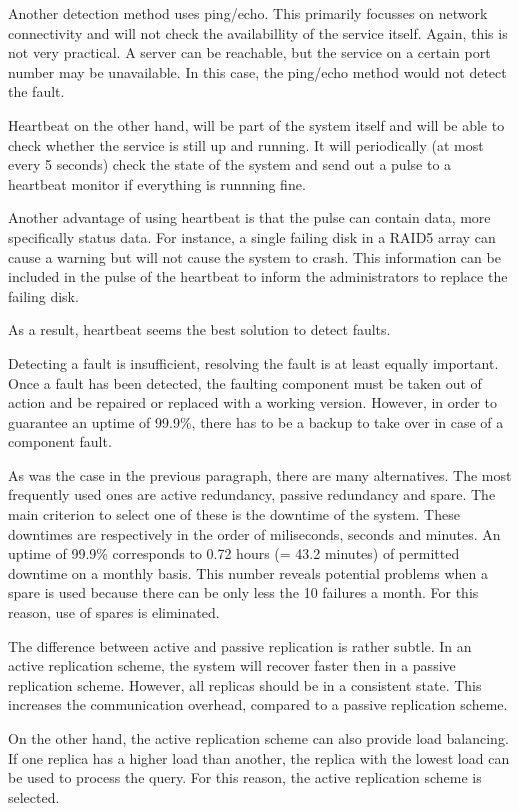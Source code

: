 \npar Another detection method uses ping/echo. This primarily focusses on
network connectivity and will not check the availabillity of the service itself.
Again, this is not very practical. A server can be reachable, but the service on
a certain port number may be unavailable. In this case, the ping/echo
method would not detect the fault. 

\npar Heartbeat on the other hand, will be part of the system itself and will be
able to check whether the service is still up and running. It will periodically
(at most every 5 seconds) check the state of the system and send out a pulse
to a heartbeat monitor if everything is runnning fine.

\npar Another advantage of using heartbeat is that the pulse can contain data,
more specifically status data. For instance, a single failing disk in a RAID5
array can cause a warning but will not cause the system to crash. This
information can be included in the pulse of the heartbeat to inform the
administrators to replace the failing disk.

\npar As a result, heartbeat seems the best solution to detect faults. 

\npar Detecting a fault is insufficient, resolving the fault is at least equally
important. Once a fault has been detected, the faulting component must be taken
out of action and be repaired or replaced with a working version. However, in
order to guarantee an uptime of 99.9\%, there has to be a backup to take over in
case of a component fault.

\npar As was the case in the previous paragraph, there are many alternatives.
The most frequently used ones are active redundancy, passive redundancy and
spare. The main criterion to select one of these is the downtime of the system.
These downtimes are respectively in the order of miliseconds, seconds and
minutes. An uptime of 99.9\% corresponds to 0.72 hours (= 43.2 minutes) of
permitted downtime on a monthly basis. This number reveals potential problems
when a spare is used because there can be only less the 10 failures a month. For
this reason, use of spares is eliminated.

\npar The difference between active and passive replication is rather subtle.
In an active replication scheme, the system will recover faster then in a
passive replication scheme. However, all replicas should be in a consistent
state. This increases the communication overhead, compared to a passive
replication scheme. 

\npar On the other hand, the active replication scheme can also provide load
balancing. If one replica has a higher load than another, the replica with the
lowest load can be used to process the query. For this reason, the active
replication scheme is selected. 

